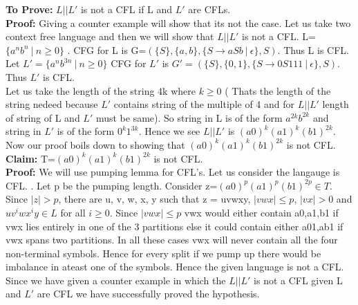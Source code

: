 \documentclass{article}
\begin{document}
\textbf{To Prove:} $L|| L'$ is not a CFL if L and $L'$ are CFLs. \\
\textbf{Proof:} Giving a counter example will show that its not the case. Let us take two context free language and then we will show that $L || L'$ is not a CFL. L=$\{a^nb^n \ | \ n \geq 0\}$ . CFG for L is G=$(\{S\},\{a,b\},\{S \rightarrow aSb \ | \ \epsilon\},S)$. Thus L is CFL. Let $ L'=\{a^nb^{3n} \ | \ n \geq 0\}$ CFG for $L'$ is $G' =(\{S\},\{0,1\},\{S \rightarrow 0S111 \ | \ \epsilon\},S)$. Thus $L'$ is CFL.\\
Let us take the length of the string 4k where $k \geq 0$ ( Thats the length of the string nedeed because $L'$ contains string of the multiple of 4 and for $L || L'$ length of string of L and $L'$ must be same). So string in L is of the form $a^{2k}b^{2k}$ and string in $L' $ is of the form $0^{k}1^{3k}$. Hence we see $L || L'$ is $(a0)^k (a1)^k (b1)^{2k}$. Now our proof boils down to showing that $(a0)^k (a1)^k (b1)^{2k}$ is not CFL.\\
\textbf{Claim:} T=$(a0)^k (a1)^k (b1)^{2k}$ is not CFL.\\
\textbf{Proof:} We will use pumping lemma for CFL's. Let us consider the langauge is CFL. . Let p be the pumping length. Consider z=$(a0)^p (a1)^p (b1)^{2p} \in T$. Since $|z| > p$, there are u, v, w, x, y such that z = uvwxy, $|vwx| \leq p$, $|vx| > 0$ and $ uv^{i}wx^{i}y \in L$ for all $i \geq 0$. Since $|vwx| \leq p$ vwx would either contain a0,a1,b1 if vwx lies entirely in one of the 3 partitions else it could contain either a01,ab1 if vwx spans two partitions. In all these cases vwx will never contain all the four non-terminal symbols. Hence for every split if we pump up there would be imbalance in ateast one of the symbols. Hence the given language is not a CFL. \\
\newline
Since we have given a counter example in which the $L||L'$ is not a CFL given L and $L'$ are CFL we have successfully proved the hypothesis. 


\pagebreak
\end{document}
